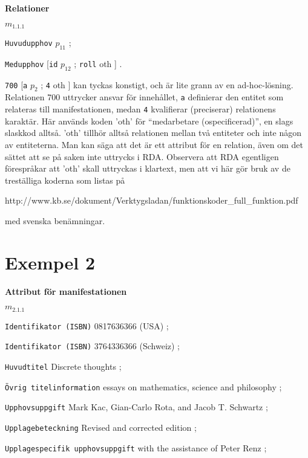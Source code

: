 \documentclass[a4,12pt]{article}
\begin{document}
\textbf{Relationer}

\noindent $m_{1.1.1}$

\texttt{Huvudupphov} $p_{11}$ ;

\texttt{Medupphov} [\texttt{id} $p_{12}$ ; \texttt{roll} oth ] .

\vspace{3mm}

\small 

\noindent \texttt{700} [\texttt{a} $p_{2}$ ; \texttt{4} oth ] kan
tyckas konstigt, och är lite grann av en ad-hoc-lösning. Relationen
700 uttrycker ansvar för innehållet, \texttt{a} definierar den entitet
som relateras till manifestationen, medan \texttt{4} kvalifierar
(preciserar) relationens karaktär. Här används koden 'oth' för
``medarbetare (ospecificerad)'', en slags slaskkod alltså. 'oth'
tillhör alltså relationen mellan två entiteter och inte någon av
entiteterna. Man kan säga att det är ett attribut för en relation,
även om det sättet att se på saken inte uttrycks i RDA. Observera att
RDA egentligen förespråkar att 'oth' skall uttryckas i klartext, men
att vi här gör bruk av de treställiga koderna som listas på 
\begin{footnotesize}
  http://www.kb.se/dokument/Verktygsladan/funktionskoder\_full\_funktion.pdf
\end{footnotesize}
med svenska benämningar.

\normalsize

\newpage

\section{Exempel 2}
\label{sec:ex2}



\textbf{Attribut för manifestationen}

\noindent $m_{2.1.1}$

 \texttt{Identifikator (ISBN)} 0817636366 (USA) ;

 \texttt{Identifikator (ISBN)} 3764336366 (Schweiz) ;

 \texttt{Huvudtitel} Discrete thoughts ;
 
\texttt{Övrig titelinformation} essays on mathematics, science and
philosophy ;

\texttt{Upphovsuppgift} Mark Kac, Gian-Carlo Rota, and Jacob T. Schwartz  ;

\texttt{Upplagebeteckning} Revised and corrected edition ;

\texttt{Upplagespecifik upphovsuppgift} with the assistance of Peter Renz ;
\end{document}
